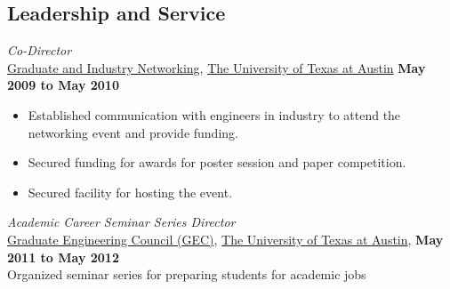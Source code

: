 \documentclass[centered]{res}
\begin{document}
\begin{resume}
\section{Leadership and Service}
\textit{Co-Director} \\
\href{http://gain.engr.utexas.edu/}{Graduate and Industry Networking},
\href{http://www.utexas.edu}{The University of Texas at Austin}
\hfill \textbf{May 2009 to May 2010}
\begin{itemize} \itemsep -2pt %
\item Established communication with engineers in industry to attend the networking event and provide funding.
\item Secured funding for awards for poster session and paper competition.
\item Secured facility for hosting the event.  
\end{itemize}

\textit{Academic Career Seminar Series Director} \\
\href{http://sites.google.com/site/utexasgecouncil/}{Graduate Engineering Council (GEC)},
\href{http://www.utexas.edu}{The University of Texas at Austin},
\hfill \textbf{May 2011 to May 2012} \\ 
Organized seminar series for preparing students for academic jobs


\end{resume}
\end{document}
